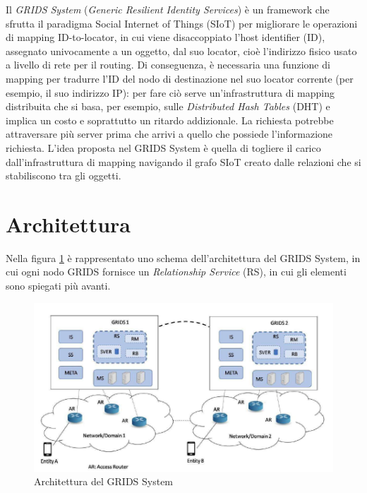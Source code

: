 Il \textit{GRIDS System} (\textit{Generic Resilient Identity Services}) è un framework che sfrutta il paradigma Social Internet of Things (SIoT) per migliorare le operazioni di mapping ID-to-locator, in cui viene disaccoppiato l'host identifier (ID), assegnato univocamente a un oggetto, dal suo locator, cioè l'indirizzo fisico usato a livello di rete per il routing. Di conseguenza, è necessaria una funzione di mapping per tradurre l'ID del nodo di destinazione nel suo locator corrente (per esempio, il suo indirizzo IP): per fare ciò serve un'infrastruttura di mapping distribuita che si basa, per esempio, sulle \textit{Distributed Hash Tables} (DHT) e implica un costo e soprattutto un ritardo addizionale. La richiesta potrebbe attraversare più server prima che arrivi a quello che possiede l'informazione richiesta. L'idea proposta nel GRIDS System è quella di togliere il carico dall'infrastruttura di mapping navigando il grafo SIoT creato dalle relazioni che si stabiliscono tra gli oggetti.

\section{Architettura}
\label{c:grids:arch}

Nella figura \ref{f:grids:arch} è rappresentato uno schema dell'architettura del GRIDS System, in cui ogni nodo GRIDS fornisce un \textit{Relationship Service} (RS), in cui gli elementi sono spiegati più avanti.

\begin{figure}[h!t]
\centerline{\includegraphics[scale=0.5]{img/GRIDSarch}}
\caption{Architettura del GRIDS System}
\label{f:grids:arch}
\end{figure}

